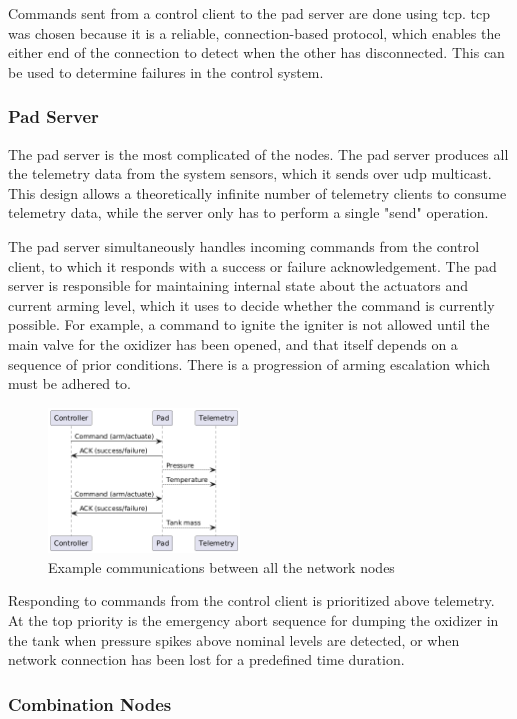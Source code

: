 Commands sent from a control client to the pad server are done using \gls{tcp}. \Gls{tcp} was chosen because it is a
reliable, connection-based protocol, which enables the either end of the connection to detect when the other has
disconnected. This can be used to determine failures in the control system.

\subsubsection{Pad Server}

The pad server is the most complicated of the nodes. The pad server produces all the telemetry data from the system
sensors, which it sends over \gls{udp} multicast. This design allows a theoretically infinite number of telemetry
clients to consume telemetry data, while the server only has to perform a single "send" operation.

The pad server simultaneously handles incoming commands from the control client, to which it responds with a success or
failure acknowledgement. The pad server is responsible for maintaining internal state about the actuators and current
arming level, which it uses to decide whether the command is currently possible. For example, a command to ignite the
igniter is not allowed until the main valve for the oxidizer has been opened, and that itself depends on a sequence of
prior conditions. There is a progression of arming escalation which must be adhered to.

\begin{figure}[H]
    \center
    \includegraphics[width=2in]{assets/diagrams/all_nodes_seq.png}
    \caption{Example communications between all the network nodes}
\end{figure}

Responding to commands from the control client is prioritized above telemetry. At the top priority is the emergency
abort sequence for dumping the oxidizer in the tank when pressure spikes above nominal levels are detected, or when
network connection has been lost for a predefined time duration.

\subsubsection{Combination Nodes}

